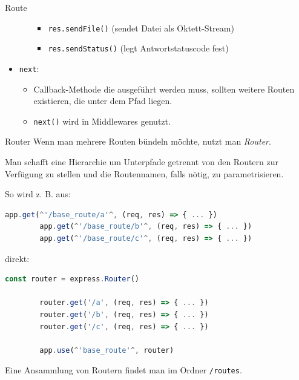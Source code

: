 \begin{defi}{Route}
\begin{itemize}
\begin{itemize}
\begin{itemize}
                            \item \texttt{res.sendFile()} (sendet Datei als Oktett-Stream)
                            \item \texttt{res.sendStatus()} (legt Antwortstatuscode fest)
                        \end{itemize}
              \end{itemize}
        \item \texttt{next}:
              \begin{itemize}
                  \item Callback-Methode die ausgeführt werden muss, sollten weitere Routen existieren, die unter dem Pfad liegen.
                  \item \texttt{next()} wird in Middlewares genutzt.
              \end{itemize}
    \end{itemize}
\end{defi}

\begin{defi}{Router}
    Wenn man mehrere Routen bündeln möchte, nutzt man \emph{Router}.

    Man schafft eine Hierarchie um Unterpfade getrennt von den Routern zur Verfügung zu stellen und die Routennamen, falls nötig, zu parametrisieren.

    So wird z. B. aus:
    \begin{lstlisting}[language=JavaScript]
        app.get(^'/base_route/a'^, (req, res) => { ... })
        app.get(^'/base_route/b'^, (req, res) => { ... })
        app.get(^'/base_route/c'^, (req, res) => { ... })
    \end{lstlisting}

    direkt:
    \begin{lstlisting}[language=JavaScript]
        const router = express.Router()
        
        router.get('/a', (req, res) => { ... })
        router.get('/b', (req, res) => { ... })
        router.get('/c', (req, res) => { ... })
        
        app.use(^'base_route'^, router)
    \end{lstlisting}

    Eine Ansammlung von Routern findet man im Ordner \texttt{/routes}.
\end{defi}

